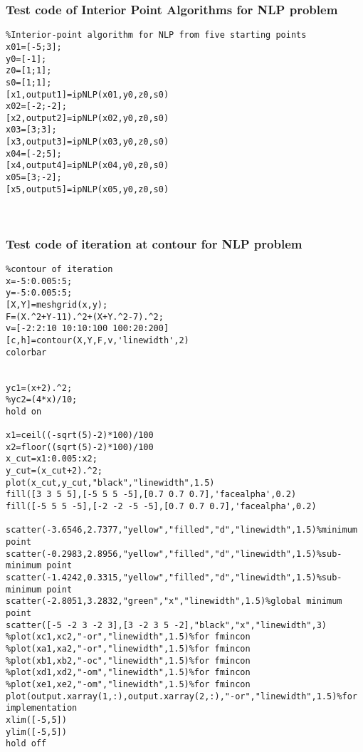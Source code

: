 \subsubsection{\bfseries Test code of Interior Point Algorithms for NLP problem}
\label{6.5.11}
{\setmainfont{Courier New Bold} \scriptsize         
\begin{lstlisting}
%Interior-point algorithm for NLP from five starting points
x01=[-5;3];
y0=[-1]; 
z0=[1;1];
s0=[1;1];
[x1,output1]=ipNLP(x01,y0,z0,s0)
x02=[-2;-2];
[x2,output2]=ipNLP(x02,y0,z0,s0)
x03=[3;3];
[x3,output3]=ipNLP(x03,y0,z0,s0)
x04=[-2;5];
[x4,output4]=ipNLP(x04,y0,z0,s0)
x05=[3;-2];
[x5,output5]=ipNLP(x05,y0,z0,s0)



\end{lstlisting}}


\subsubsection{\bfseries Test code of iteration at contour for NLP problem}
\label{6.5.12}
{\setmainfont{Courier New Bold} \scriptsize         
\begin{lstlisting}
%contour of iteration
x=-5:0.005:5;
y=-5:0.005:5;
[X,Y]=meshgrid(x,y);
F=(X.^2+Y-11).^2+(X+Y.^2-7).^2;
v=[-2:2:10 10:10:100 100:20:200]
[c,h]=contour(X,Y,F,v,'linewidth',2)
colorbar


yc1=(x+2).^2;
%yc2=(4*x)/10;
hold on

x1=ceil((-sqrt(5)-2)*100)/100
x2=floor((sqrt(5)-2)*100)/100
x_cut=x1:0.005:x2;
y_cut=(x_cut+2).^2;
plot(x_cut,y_cut,"black","linewidth",1.5)
fill([3 3 5 5],[-5 5 5 -5],[0.7 0.7 0.7],'facealpha',0.2)
fill([-5 5 5 -5],[-2 -2 -5 -5],[0.7 0.7 0.7],'facealpha',0.2)

scatter(-3.6546,2.7377,"yellow","filled","d","linewidth",1.5)%minimum point
scatter(-0.2983,2.8956,"yellow","filled","d","linewidth",1.5)%sub-minimum point
scatter(-1.4242,0.3315,"yellow","filled","d","linewidth",1.5)%sub-minimum point
scatter(-2.8051,3.2832,"green","x","linewidth",1.5)%global minimum point
scatter([-5 -2 3 -2 3],[3 -2 3 5 -2],"black","x","linewidth",3)
%plot(xc1,xc2,"-or","linewidth",1.5)%for fmincon
%plot(xa1,xa2,"-or","linewidth",1.5)%for fmincon
%plot(xb1,xb2,"-oc","linewidth",1.5)%for fmincon
%plot(xd1,xd2,"-om","linewidth",1.5)%for fmincon
%plot(xe1,xe2,"-om","linewidth",1.5)%for fmincon
plot(output.xarray(1,:),output.xarray(2,:),"-or","linewidth",1.5)%for implementation
xlim([-5,5])
ylim([-5,5])
hold off



\end{lstlisting}}

